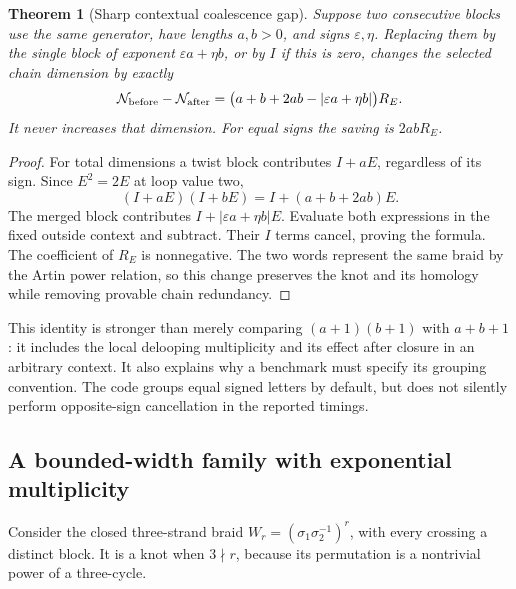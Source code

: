 \documentclass[11pt,letterpaper]{article}
\newtheorem{theorem}{Theorem}[section]
\theoremstyle{definition}
\newcommand{\N}{\mathcal N}
\newcommand{\eps}{\varepsilon}
\begin{document}
\begin{theorem}[Sharp contextual coalescence gap]\label{thm:merge}
Suppose two consecutive blocks use the same generator, have lengths \(a,b>0\), and signs \(\eps,\eta\). Replacing them by the single block of exponent \(\eps a+\eta b\), or by \(I\) if this is zero, changes the selected chain dimension by exactly
\begin{equation}\label{eq:mergegap}
 \N_{\rm before}-\N_{\rm after}
  =\bigl(a+b+2ab-|\eps a+\eta b|\bigr)R_E.
\end{equation}
It never increases that dimension. For equal signs the saving is \(2abR_E\).
\end{theorem}
\begin{proof}
For total dimensions a twist block contributes \(I+aE\), regardless of its sign. Since \(E^2=2E\) at loop value two,
\[
 (I+aE)(I+bE)=I+(a+b+2ab)E.
\]
The merged block contributes \(I+|\eps a+\eta b|E\). Evaluate both expressions in the fixed outside context and subtract. Their \(I\) terms cancel, proving the formula. The coefficient of \(R_E\) is nonnegative. The two words represent the same braid by the Artin power relation, so this change preserves the knot and its homology while removing provable chain redundancy.
\end{proof}

This identity is stronger than merely comparing \((a+1)(b+1)\) with \(a+b+1\): it includes the local delooping multiplicity and its effect after closure in an arbitrary context. It also explains why a benchmark must specify its grouping convention. The code groups equal signed letters by default, but does not silently perform opposite-sign cancellation in the reported timings.

\subsection{A bounded-width family with exponential multiplicity}
Consider the closed three-strand braid
\(W_r=(\sigma_1\sigma_2^{-1})^r\), with every crossing a distinct block. It is a knot when \(3\nmid r\), because its permutation is a nontrivial power of a three-cycle.
\end{document}
